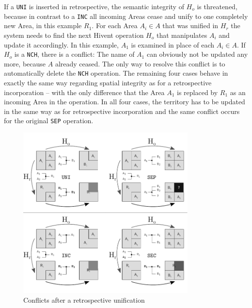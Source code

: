 If a \texttt{UNI} is inserted in retrospective, the semantic integrity of $H_o$ is threatened, because in contrast to a \texttt{INC} all incoming Areas cease and unify to one completely new Area, in this example $R_1$. For each Area $A_i \in A$ that was unified in $H_r$ the system needs to find the next Hivent operation $H_o$ that manipulates $A_i$ and update it accordingly. In this example, $A_1$ is examined in place of each $A_i \in A$. If $H_o$ is a \texttt{NCH}, there is a conflict: The name of $A_1$ can obviously not be updated any more, because $A$ already ceased. The only way to resolve this conflict is to automatically delete the \texttt{NCH} operation. The remaining four cases behave in exactly the same way regarding spatial integrity as for a retrospective incorporation -- with the only difference that the Area $A_1$ is replaced by $R_1$ as an incoming Area in the operation. In all four cases, the territory has to be updated in the same way as for retrospective incorporation and the same conflict occurs for the original \texttt{SEP} operation.

\begin{figure}[ht]
\vspace{1em}
  \centering
  \includegraphics[width=0.8\textwidth]{graphics/development/editing_hivent_data/retrospective_updates/UNI}
  \caption{Conflicts after a retrospective unification}
  \label{fig:update_conflict_UNI}
\end{figure}


